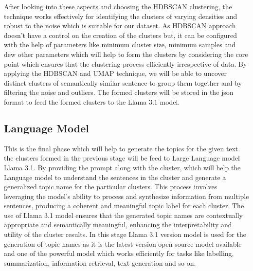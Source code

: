 After looking into these aspects and choosing the HDBSCAN clustering, the technique works effectively for identifying the clusters of varying densities and robust to the noise which is suitable for our dataset. 
As HDBSCAN approach doesn't have a control on the creation of the clusters but, it can be configured with the help of parameters like minimum cluster size, minimum samples and dew other parameters which will help 
to form the clusters by considering the core point which ensures that the clustering process efficiently irrespective of data. By applying the HDBSCAN and UMAP technique, we will be able to uncover distinct clusters 
of semantically similar sentence to group them together and by filtering the noise and outliers. The formed clusters will be stored in the json format to feed the formed clusters to the Llama 3.1 model.
\subsection{Language Model}
This is the final phase which will help to generate the topics for the given text. the clusters formed in the previous stage will be feed to Large Language model Llama 3.1. By providing the prompt along with the cluster, which will help 
the Language model to understand the sentences in the cluster and generate a generalized topic name for the particular clusters. This process involves leveraging the model’s ability to process and synthesize information from multiple 
sentences, producing a coherent and meaningful topic label for each cluster. The use of Llama 3.1 model ensures that the generated topic names are contextually appropriate and semantically meaningful, enhancing the interpretability
and utility of the cluster results. In this stage Llama 3.1 version model is used for the generation of topic names as it is the latest version open source model available and one of the powerful model which works efficiently 
for tasks like labelling, summarization, information retrieval, text generation and so on.

